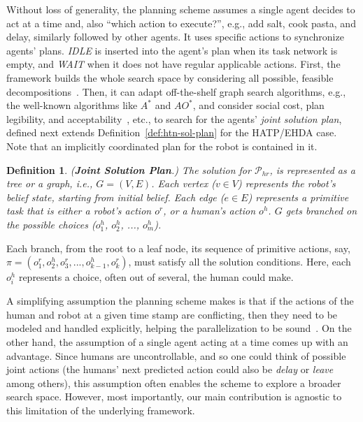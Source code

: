 \documentclass[letterpaper]{article} %
\newtheorem{definition}{Definition}
\begin{document}
Without loss of generality, the planning scheme assumes a single agent decides to act at a time and, also ``which action to execute?'', e.g., add salt, cook pasta, and delay, similarly followed by other agents. 
It uses specific actions to synchronize agents' plans. {\em IDLE} is inserted into the agent's plan when its task network is empty, and {\em WAIT} when it does not have regular applicable actions. First, the framework builds the whole search space by considering all possible, feasible decompositions~\cite{buisan:hal-03684211}. 
Then, it can adapt off-the-shelf graph search algorithms, e.g., the well-known algorithms like $A^*$ and $AO^*$, and consider social cost, plan legibility, and acceptability~\cite{alili2009task}, etc., to search for the agents' \textit{joint solution plan}, defined next extends Definition~\ref{def:htn-sol-plan} for the HATP/EHDA case. Note that an implicitly coordinated plan for the robot is contained in it. 

\begin{definition} \label{def:joint-sol-plan}
(\textbf{Joint Solution Plan}.) 
{The solution for $\mathcal{P}_{hr}$, is represented as a tree or a graph, i.e., $G=(V,E)$. Each vertex ($v \in V$) represents the robot's belief state, starting from initial belief. Each edge ($e \in E$) represents a primitive task that is either a robot's action $o^{r}$, or a human's action $o^{h}$. $G$ gets branched on the possible choices ($o^{h}_1$, $o^{h}_2$, ..., $o^{h}_m$). 
}  
\end{definition}

Each branch, from the root to a leaf node, its sequence of primitive actions, say,  $\pi=(o_1^r,o_2^h,o_3^r,...,o_{k-1}^h,o_k^r)$, must satisfy all the solution conditions. 
Here, each $o_i^h$ represents a choice, often out of several, the human could make.

A simplifying assumption the planning scheme makes is that if the actions of the human and robot at a given time stamp are conflicting, then they need to be modeled and handled explicitly, helping the parallelization to be sound~\cite{CrosbyJR14,ShekharB20}.
On the other hand, the assumption of a single agent acting at a time comes up with an advantage. Since humans are uncontrollable, and so one could think of possible joint actions (the humans' next predicted action could also be \textit{delay} or \textit{leave} among others), this assumption often enables the scheme to explore a broader search space. 
However, most importantly, our main contribution is agnostic to this limitation of the underlying framework.
\end{document}
